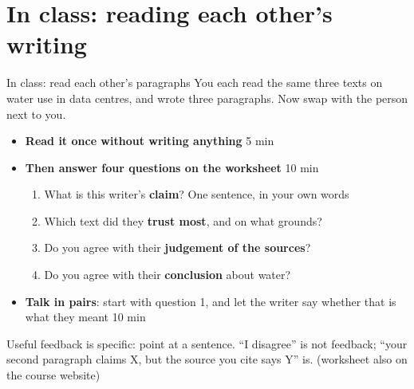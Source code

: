 \documentclass[aspectratio=169]{beamer}
\begin{document}
\section{In class: reading each other's writing}

\begin{frame}{In class: read each other's paragraphs}
You each read the same three texts on water use in data centres, and wrote
three paragraphs.  Now swap with the person next to you.
\begin{itemize}
  \item \textbf{Read it once without writing anything} \hfill 5 min
  \item \textbf{Then answer four questions on the worksheet} \hfill 10 min
    \begin{enumerate}
    \item What is this writer's \textbf{claim}?  One sentence, in your own words
    \item Which text did they \textbf{trust most}, and on what grounds?
    \item Do you agree with their \textbf{judgement of the sources}?
    \item Do you agree with their \textbf{conclusion} about water?
    \end{enumerate}
  \item \textbf{Talk in pairs}: start with question 1, and let the writer
    say whether that is what they meant \hfill 10 min
\end{itemize}
\vspace{1ex}
Useful feedback is specific: point at a sentence.  ``I disagree'' is not
feedback; ``your second paragraph claims X, but the source you cite says Y''
is.  \hfill {\footnotesize (worksheet also on the course website)}
\end{frame}
\end{document}
